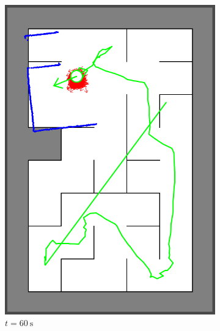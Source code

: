 \begin{figure}[H]
\begin{subfigure}{0.2\textwidth}
         \includegraphics[width=\textwidth]{figures/localization2_60s.png}
         \caption{$t = \SI{60}{\second}$}
         \label{mapping20s}
     \end{subfigure}
     \hspace{1em}
     \begin{subfigure}{0.2\textwidth}
         \centering

\end{subfigure}
\end{figure}
